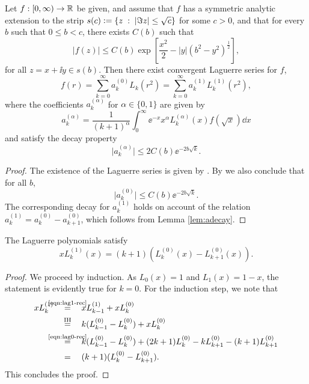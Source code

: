\begin{proposition} \label{prop:szasz}
Let $f:[0,\infty)\to\mathbb{R}$ be given, and assume that $f$ has a symmetric analytic extension to the
strip $s(c) \vcentcolon= \left\{ z \;:\; |\Im z| \leq \sqrt{c} \right\}$ for some $c>0$, and that for every $b$ such
that $0 \leq b<c$, there exists $C(b)$ such that
\begin{equation} \label{eqn:sz-slowdecay}
    |f(z)| \leq C(b) \exp\left[\frac{x^2}{2} - |y|\left(b^2 - y^2\right)^{\frac{1}{2}}\right],
\end{equation}
for all $z = x + \ii y \in s(b)$. Then there exist convergent Laguerre series for $f$,
\[
    f(r) = \sum_{k=0}^\infty a^{(0)}_k L_k(r^2) = \sum_{k=0}^\infty a^{(1)}_k L^{(1)}_k(r^2),
\]
where the coefficients $a^{(\alpha)}_k$ for $\alpha\in\{0,1\}$ are given by
\[
    a^{(\alpha)}_k = \frac{1}{(k+1)^\alpha}\int_0^\infty \ee^{-x} x^\alpha L^{(\alpha)}_k(x)f(\sqrt{x})\dd x
\]
and satisfy the decay property
\[
    \big|a^{(\alpha)}_k\big| \leq 2 C(b) \ee^{-2b\sqrt{k}}.
\]
\end{proposition}
\begin{proof}
The existence of the Laguerre series is given by \cite[Theorem B]{Szasz1958raf}.  By \cite[Lemma 3.4]{Szasz1958raf} we
also conclude that for all $b$,
\[
    \big|a^{(0)}_k\big| \leq C(b) \ee^{-2b\sqrt{k}}.
\]
The corresponding decay for $a^{(1)}_k$ holds on account of the relation $a^{(1)}_k = a^{(0)}_k -
a^{(0)}_{k+1}$, which follows from Lemma \ref{lem:adecay}.
\end{proof}
\begin{lemma} \label{lem:adecay}
The Laguerre polynomials satisfy
\[
    xL^{(1)}_k(x) = (k+1)(L^{(0)}_k(x)-L^{(0)}_{k+1}(x)).
\]
\end{lemma}
\begin{proof}
We proceed by induction. As $L_0(x)=1$ and $L_1(x)=1-x$, the statement is evidently true for $k=0$. For the
induction step, we note that
\begin{align*}
    xL^{(1)}_k
    & \quad \overset{\mathclap{\text{\eqref{eqn:lag1-rec}}}}{=} \quad
    xL^{(1)}_{k-1} + xL^{(0)}_k \\
    & \quad \overset{\mathclap{\text{IH}}}{=} \quad
    k(L^{(0)}_{k-1} - L^{(0)}_k) + xL^{(0)}_k \\
    & \quad \overset{\mathclap{\text{\eqref{eqn:lag0-rec}}}}{=} \quad
    k(L^{(0)}_{k-1} - L^{(0)}_k) + (2k+1)L^{(0)}_k - kL^{(0)}_{k+1} - (k+1)L^{(0)}_{k+1} \\
    & \quad = \quad (k+1)(L^{(0)}_k-L^{(0)}_{k+1}).
\end{align*}
This concludes the proof.
\end{proof}

